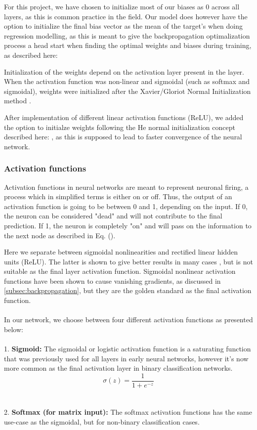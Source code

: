 For this project, we have chosen to initialize most of our biases as 0 across all layers, as this is common 
practice in the field. Our model does however have the option to initialize the final bias vector as the mean 
of the target's when doing regression modelling, as this is meant to give the backpropagation optimalization 
process a head start when finding the optimal weights and biases during training, as described here: \cite{best_bias}

Initialization of the weights depend on the activation layer present in the layer. When the activation 
function was non-linear and sigmoidal (such as softmax and sigmoidal), weights were initialized after
the Xavier/Gloriot Normal Initialization method \cite{xaviergloriot}. 

After implementation of different linear activation functions (ReLU), we added the option to initialze
weights following the He normal initialization concept described here: \cite{heman}, as this is supposed to 
lead to faster convergence of the neural network. 

\subsubsection{Activation functions}\label{sssec:activation_functions}

Activation functions in neural networks are meant to represent neuronal firing, a process which in simplified terms is either on or off. Thus, the output 
of an activation function is going to be between 0 and 1, depending on the input. If 0, the neuron can be considered "dead" and will not contribute 
to the final prediction. If 1, the neuron is completely "on" and will pass on the information to the next node as described in Eq. (\cite{ffnn}). 

Here we separate between sigmoidal nonlinearities and rectified linear hidden units (ReLU). The latter is shown to give better results in many cases 
\cite{relu_best_ever}, but is not suitable as the final layer activation function. Sigmoidal nonlinear activation functions have been shown to 
cause vanishing gradients, as discussed in \ref{subsec:backpropagation}, but they are the golden standard as the final activation function. 
\\
\\
In our network, we choose between four different activation functions as presented below: 
\\
\\
1. \textbf{Sigmoid:}
The sigmoidal or logistic activation function is a saturating function that was previously used for all layers in early neural networks, 
however it's now more common as the final activation layer in binary classification networks.
\[
\sigma(z) = \frac{1}{1 + e^{-z}}
\]
\\
\\
2. \textbf{Softmax (for matrix input):}
The softmax activation functions has the same use-case as the sigmoidal, but for non-binary classification cases. 

